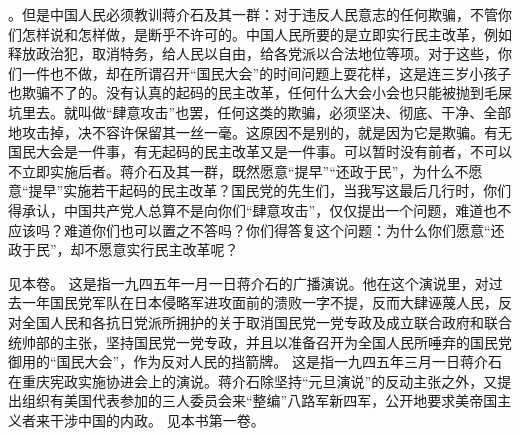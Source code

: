 。但是中国人民必须教训蒋介石及其一群：对于违反人民意志的任何欺骗，不管你们怎样说和怎样做，是断乎不许可的。中国人民所要的是立即实行民主改革，例如释放政治犯，取消特务，给人民以自由，给各党派以合法地位等项。对于这些，你们一件也不做，却在所谓召开“国民大会”的时间问题上耍花样，这是连三岁小孩子也欺骗不了的。没有认真的起码的民主改革，任何什么大会小会也只能被抛到毛屎坑里去。就叫做“肆意攻击”也罢，任何这类的欺骗，必须坚决、彻底、干净、全部地攻击掉，决不容许保留其一丝一毫。这原因不是别的，就是因为它是欺骗。有无国民大会是一件事，有无起码的民主改革又是一件事。可以暂时没有前者，不可以不立即实施后者。蒋介石及其一群，既然愿意“提早”“还政于民”，为什么不愿意“提早”实施若干起码的民主改革？国民党的先生们，当我写这最后几行时，你们得承认，中国共产党人总算不是向你们“肆意攻击”，仅仅提出一个问题，难道也不应该吗？难道你们也可以置之不答吗？你们得答复这个问题：为什么你们愿意“还政于民”，却不愿意实行民主改革呢？


\begin{maonote}
见本卷。
这是指一九四五年一月一日蒋介石的广播演说。他在这个演说里，对过去一年国民党军队在日本侵略军进攻面前的溃败一字不提，反而大肆诬蔑人民，反对全国人民和各抗日党派所拥护的关于取消国民党一党专政及成立联合政府和联合统帅部的主张，坚持国民党一党专政，并且以准备召开为全国人民所唾弃的国民党御用的“国民大会”，作为反对人民的挡箭牌。
这是指一九四五年三月一日蒋介石在重庆宪政实施协进会上的演说。蒋介石除坚持“元旦演说”的反动主张之外，又提出组织有美国代表参加的三人委员会来“整编”八路军新四军，公开地要求美帝国主义者来干涉中国的内政。
见本书第一卷。
\end{maonote}
